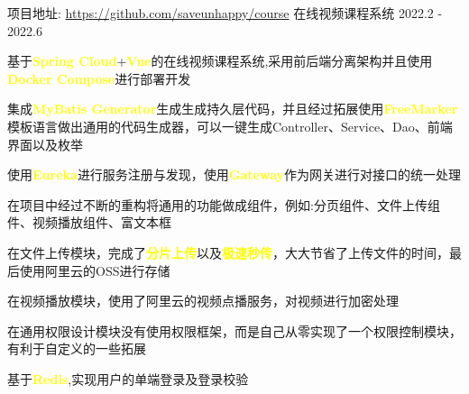 
\begin{cventries}
	\cventry
	{项目地址: \url{https://github.com/saveunhappy/course}} %
	{在线视频课程系统} %
	{} %
	{2022.2 - 2022.6} %
	{
		\begin{cvitems} %
			\item {基于\textcolor{yellow}{\textbf{Spring Cloud}}+\textcolor{yellow}{\textbf{Vue}}的在线视频课程系统,采用前后端分离架构并且使用\textcolor{yellow}{\textbf{Docker Compose}}进行部署开发}
			\item {集成\textcolor{yellow}{\textbf{MyBatis Generator}}生成生成持久层代码，并且经过拓展使用\textcolor{yellow}{\textbf{FreeMarker}}模板语言做出通用的代码生成器，可以一键生成Controller、Service、Dao、前端界面以及枚举}
			\item {使用\textcolor{yellow}{\textbf{Eureka}}进行服务注册与发现，{使用\textcolor{yellow}{\textbf{Gateway}}作为网关进行对接口的统一处理}
				\item 在项目中经过不断的重构将通用的功能做成组件，例如:分页组件、文件上传组件、视频播放组件、富文本框}
			\item {在文件上传模块，完成了\textcolor{yellow}{\textbf{分片上传}}以及\textcolor{yellow}{\textbf{极速秒传}}，大大节省了上传文件的时间，最后使用阿里云的OSS进行存储}
			\item {在视频播放模块，使用了阿里云的视频点播服务，对视频进行加密处理}
			\item {在通用权限设计模块没有使用权限框架，而是自己从零实现了一个权限控制模块，有利于自定义的一些拓展}
			\item {基于\textcolor{yellow}{\textbf{Redis}},实现用户的单端登录及登录校验}
		\end{cvitems}
	}
	

\end{cventries}
